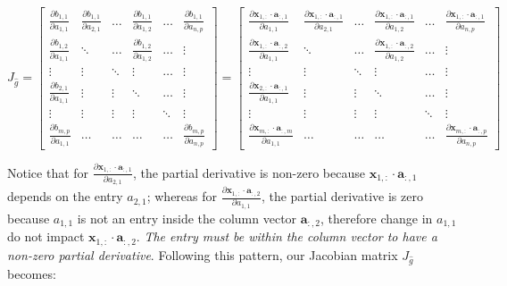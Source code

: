 \documentclass{article}
\begin{document}
\begin{center}$
J_{\widehat{g}} = 
\begin{bmatrix}
    \frac{\partial b_{1,1}}{\partial a_{1,1}} & \frac{\partial b_{1,1}}{\partial a_{2,1}} &\hdots &  \frac{\partial b_{1,1}}{\partial a_{1,2}} &\hdots & \frac{\partial b_{1,1}}{\partial a_{n,p}} \\
    \frac{\partial b_{1, 2}}{\partial a_{1,1}}  & \ddots &\hdots & \frac{\partial b_{1,2}}{\partial a_{1,2}}& \hdots& \vdots \\
    \vdots & \vdots & \ddots & \vdots & \hdots & \vdots\\
    \frac{\partial b_{2,1}}{\partial a_{1,1}} & \vdots & \vdots & \ddots & \hdots & \vdots\\
    \vdots & \vdots & \vdots & \vdots & \ddots & \vdots\\
    \frac{\partial b_{m,p}}{\partial a_{1,1}}  & \hdots & \hdots & \hdots & \hdots & \frac{\partial b_{m,p}}{\partial a_{n,p}}
\end{bmatrix}
=
\begin{bmatrix}
    \frac{\partial \mathbf{x}_{1,:} \cdot \mathbf{a}_{:,1}}{\partial a_{1,1}} & \frac{\partial \mathbf{x}_{1,:} \cdot \mathbf{a}_{:,1}}{\partial a_{2,1}} &\hdots &  \frac{\partial \mathbf{x}_{1,:} \cdot \mathbf{a}_{:,1}}{\partial a_{1,2}} &\hdots & \frac{\partial \mathbf{x}_{1,:} \cdot \mathbf{a}_{:,1}}{\partial a_{n,p}} \\
    \frac{\partial \mathbf{x}_{1,:} \cdot \mathbf{a}_{:,2}}{\partial a_{1,1}}  & \ddots &\hdots & \frac{\partial \mathbf{x}_{1,:} \cdot \mathbf{a}_{:,2}}{\partial a_{1,2}}& \hdots& \vdots \\
    \vdots & \vdots & \ddots & \vdots & \hdots & \vdots\\
    \frac{\partial \mathbf{x}_{2,:} \cdot \mathbf{a}_{:,1}}{\partial a_{1,1}} & \vdots & \vdots & \ddots & \hdots & \vdots\\
    \vdots & \vdots & \vdots & \vdots & \ddots & \vdots\\
    \frac{\partial \mathbf{x}_{m,:} \cdot \mathbf{a}_{:,m}}{\partial a_{1,1}}  & \hdots & \hdots & \hdots & \hdots & \frac{\partial \mathbf{x}_{m,:} \cdot \mathbf{a}_{:,p}}{\partial a_{n,p}}
\end{bmatrix}
$
\end{center}
Notice that for $\frac{\partial \mathbf{x}_{1, :} \cdot \mathbf{a}_{:,1}}{\partial a_{2,1}}$, the partial derivative is non-zero because $\mathbf{x}_{1, :} \cdot \mathbf{a}_{:,1}$ depends on the entry $a_{2,1}$; whereas for $\frac{\partial \mathbf{x}_{1,:} \cdot \mathbf{a}_{:,2}}{\partial a_{1,1}}$, the partial derivative is zero because $a_{1,1}$ is not an entry inside the column vector $\mathbf{a}_{:, 2}$, therefore change in $a_{1,1}$ do not impact $\mathbf{x}_{1,:} \cdot \mathbf{a}_{:,2}$. \textit{The entry must be within the column vector to have a non-zero partial derivative}. Following this pattern, our Jacobian matrix $J_{\widehat{g}}$ becomes:
\end{document}
